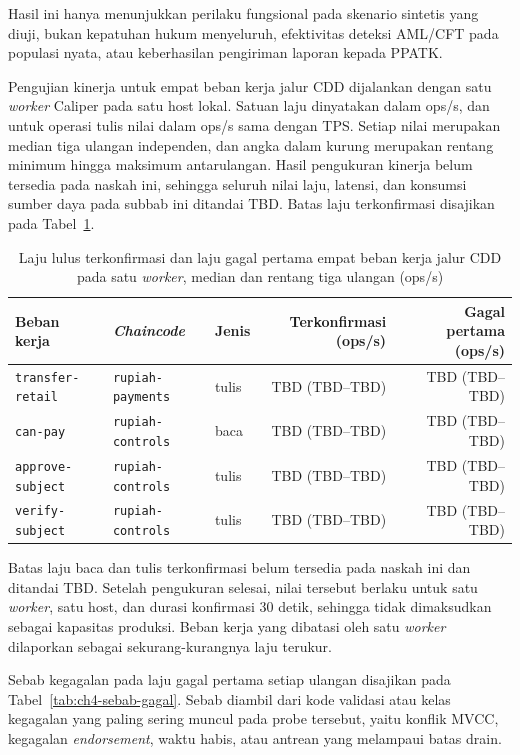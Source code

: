 Hasil ini hanya menunjukkan perilaku fungsional pada skenario sintetis yang diuji,
bukan kepatuhan hukum menyeluruh, efektivitas deteksi AML/CFT pada populasi
nyata, atau keberhasilan pengiriman laporan kepada PPATK.

Pengujian kinerja untuk empat beban kerja jalur CDD dijalankan dengan satu \textit{worker} Caliper pada satu host lokal. Satuan laju dinyatakan dalam ops/s, dan untuk operasi tulis nilai dalam ops/s sama dengan TPS. Setiap nilai merupakan median tiga ulangan independen, dan angka dalam kurung merupakan rentang minimum hingga maksimum antarulangan. Hasil pengukuran kinerja belum tersedia pada naskah ini, sehingga seluruh nilai laju, latensi, dan konsumsi sumber daya pada subbab ini ditandai TBD. Batas laju terkonfirmasi disajikan pada Tabel~\ref{tab:ch4-kapasitas-kontrol}.

\begin{table}[H]
\centering
\caption{Laju lulus terkonfirmasi dan laju gagal pertama empat beban kerja jalur CDD pada satu \textit{worker}, median dan rentang tiga ulangan (ops/s)}
\label{tab:ch4-kapasitas-kontrol}
\scriptsize
\begin{tabular}{lllrr}
\toprule
Beban kerja & \textit{Chaincode} & Jenis & Terkonfirmasi (ops/s) & Gagal pertama (ops/s) \\
\midrule
\texttt{transfer-retail} & \texttt{rupiah-payments} & tulis & TBD (TBD--TBD) & TBD (TBD--TBD) \\
\texttt{can-pay} & \texttt{rupiah-controls} & baca & TBD (TBD--TBD) & TBD (TBD--TBD) \\
\texttt{approve-subject} & \texttt{rupiah-controls} & tulis & TBD (TBD--TBD) & TBD (TBD--TBD) \\
\texttt{verify-subject} & \texttt{rupiah-controls} & tulis & TBD (TBD--TBD) & TBD (TBD--TBD) \\
\bottomrule
\end{tabular}%
\end{table}

Batas laju baca dan tulis terkonfirmasi belum tersedia pada naskah ini dan ditandai TBD. Setelah pengukuran selesai, nilai tersebut berlaku untuk satu \textit{worker}, satu host, dan durasi konfirmasi 30 detik, sehingga tidak dimaksudkan sebagai kapasitas produksi. Beban kerja yang dibatasi oleh satu \textit{worker} dilaporkan sebagai sekurang-kurangnya laju terukur.

Sebab kegagalan pada laju gagal pertama setiap ulangan disajikan pada Tabel~\ref{tab:ch4-sebab-gagal}. Sebab diambil dari kode validasi atau kelas kegagalan yang paling sering muncul pada probe tersebut, yaitu konflik MVCC, kegagalan \textit{endorsement}, waktu habis, atau antrean yang melampaui batas drain.


